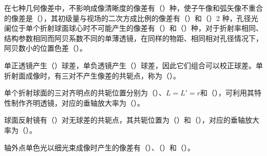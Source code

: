 \documentclass[padl, analysis, notocnum]{ExBook}
\newcommand{\answerarea}[1][3.5cm]{%
  \par\vspace{1mm}%
  \noindent{\color{themeColor!35}\rule{\linewidth}{0.4pt}}\par
  \noindent\begin{minipage}[t][#1][t]{\linewidth}\vspace{0pt}\end{minipage}\par
  \noindent{\color{themeColor!35}\rule{\linewidth}{0.4pt}}\par
}
\begin{document}
\begin{qitems}[startnum=3]
\qitem 在七种几何像差中，不影响成像清晰度的像差有（\hspace{1.6em}）种，使子午像和弧矢像不重合的像差是（\hspace{1.6em}），其初级量与视场的二次方成比例的像差有（\hspace{1.6em}）和（\hspace{1.6em}）2 种，孔径光阑位于单个折射球面球心时不可能产生的像差有（\hspace{1.6em}）和（\hspace{1.6em}）种，对于折射率相同、结构参数相同而阿贝系数不同的单薄透镜，在同样的物距、相同相对孔径情况下，阿贝数小的位置色差（\hspace{1.6em}）。
\label{q:116:start}
\answerarea[4.0cm]
\label{q:116:end}
\end{qitems}

\begin{qitems}[startnum=4]
\qitem 单正透镜产生（\hspace{1.6em}）球差，单负透镜产生（\hspace{1.6em}）球差，因此它们组合可以校正球差。单折射面成像时，有三对不产生像差的共轭点，称为（\hspace{1.6em}）。
\label{q:117:start}
\answerarea[4.0cm]
\label{q:117:end}
\end{qitems}

\begin{qitems}[startnum=5]
\qitem 单个折射球面的三对齐明点的共轭位置分别为（\hspace{1.6em}）、$L=L'=r$和（\hspace{1.6em}），可利用其特性制作齐明透镜，对应的垂轴放大率为（\hspace{1.6em}）。
\label{q:118:start}
\answerarea[4.0cm]
\label{q:118:end}
\end{qitems}

\begin{qitems}[startnum=6]
\qitem 球面反射镜有（\hspace{1.6em}）对无球差的共轭点，其共轭位置为（\hspace{1.6em}）和（\hspace{1.6em}），对应的垂轴放大率为（\hspace{1.6em}）。
\label{q:119:start}
\answerarea[4.0cm]
\label{q:119:end}
\end{qitems}

\begin{qitems}[startnum=7]
\qitem 轴外点单色光以细光束成像时产生的像差有（\hspace{1.6em}）、（\hspace{1.6em}）和（\hspace{1.6em}）。
\label{q:120:start}
\answerarea[4.0cm]
\label{q:120:end}
\end{qitems}
\end{document}
